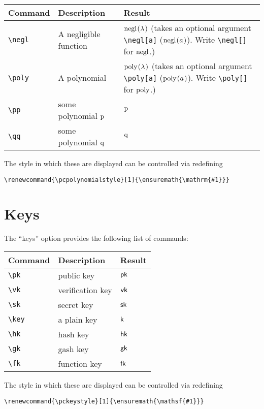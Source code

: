 \documentclass[a4paper]{report}
\begin{document}
\begin{center}
\begin{tabular}{l l p{7.5cm}}
\textbf{Command} & \textbf{Description} & \textbf{Result} \\\hline
\lstinline$\negl$ & A negligible function & $\negl$ (takes an optional argument \lstinline$\negl[a]$ ($\negl[a]$). Write \lstinline$\negl[]$ for $\negl[]$.)  \\
\lstinline$\poly$ &  A polynomial & $\poly$ (takes an optional argument \lstinline$\poly[a]$ ($\poly[a]$). Write \lstinline$\poly[]$ for $\poly[]$.) \\
\lstinline$\pp$ & some polynomial $\pp$ & $\pp$  \\
\lstinline$\qq$ & some polynomial $\qq$ &  $\qq$  \\
\end{tabular}
\end{center}

The style in which these are displayed can be controlled via redefining
\begin{lstlisting}
\renewcommand{\pcpolynomialstyle}[1]{\ensuremath{\mathrm{#1}}}
\end{lstlisting}

\section{Keys}
The \enquote{keys} option provides the following list of commands:


\begin{center}
\begin{tabular}{l l l}
\textbf{Command} & \textbf{Description} & \textbf{Result} \\\hline
\lstinline$\pk$ &public key & $\pk$  \\
\lstinline$\vk$ &  verification key& $\vk$  \\
\lstinline$\sk$ & secret key&  $\sk$  \\
\lstinline$\key$ & a plain key& $\key$  \\
\lstinline$\hk$ & hash key&  $\hk$  \\
\lstinline$\gk$ &gash key & $\gk$  \\
\lstinline$\fk$ & function key & $\fk$  
\end{tabular}
\end{center}

The style in which these are displayed can be controlled via redefining
\begin{lstlisting}
\renewcommand{\pckeystyle}[1]{\ensuremath{\mathsf{#1}}}
\end{lstlisting}
\end{document}

